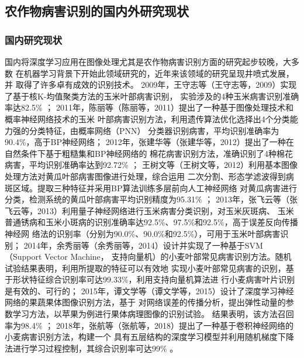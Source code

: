 \subsection{\hei\xiaosan\textbf{农作物病害识别的国内外研究现状}}
  \subsubsection{\hei\sihao\textbf{国内研究现状}}
    国内将深度学习应用在图像处理尤其是农作物病害识别方面的研究起步较晚，大多数
    在机器学习背景下开始此领域研究的，近年来该领域的研究呈现井喷式发展，并
    取得了许多卓有成效的识别技术。
    2009年，王守志等（王守志等，2009）实现了基于核K-均值聚类方法的玉米叶部病害识别，
    实验涉及的4种玉米病害识别准确率达82.5\% \cite{王守志2009基于核}；
    2011年，陈丽等（陈丽等，2011）提出了一种基于图像处理技术和概率神经网络技术的玉米
    叶部病害识别方法，利用遗传算法优化选择出4个分类能力强的分类特征，由概率网络（PNN）
    分类器识别病害，平均识别准确率为90.4\%，高于BP神经网络\cite{陈丽2011概率神经网络在玉米叶部病害识别中的应用}；
    2012年，张建华等（张建华等，2012）提出了一种在自然条件下基于粗糙集和BP神经网络的
    棉花病害识别方法，准确识别了4种棉花病害，平均识别准确率达到92.72\% \cite{张建华2012基于粗糙集和}；
    王树文等（王树文等，2012）利用基本图像处理方法对黄瓜叶部病害图像进行处理，综合运用
    二次分割、形态学滤波得到病斑区域。提取三种特征并采用BP算法训练多层前向人工神经网络
    对黄瓜病害进行分类，检测系统的黄瓜叶部病害平均识别精度为95.31\% \cite{王树文2012基于图像处理技术的黄瓜叶片病害识别诊断系统研究}；
    2013年，张飞云等（张飞云等，2013）利用量子神经网络进行玉米病害分类识别，对玉米灰斑病、
    玉米普通锈病和玉米小斑病的识别准确率达92.5\%、97.5\%和92.5\%，高于误差反向传播神经网
    络法的识别率（分别为90.0\%、90.0\%和92.5\%），可用于玉米叶部病害识别\cite{张飞云2013基于量子神经网络和组合特征参数的玉米叶部病害识别}；
    2014年，余秀丽等（余秀丽等，2014）设计并实现了一种基于SVM（Support Vector Machine，
    支持向量机）的小麦叶部常见病害识别方法。随机试验结果表明，利用所提取的特征可以有效地
    实现小麦叶部常见病害的识别，基于形状特征综合识别率可达99.33\%，利用支持向量机算法进
    行小麦病害叶片识别是有效的、可行的\cite{余秀丽2014基于}；
    2015年，谭文学等（谭文学等，2015）设计了深度学习神经网络的果蔬果体图像识别方法，基于
    对网络误差的传播分析，提出弹性动量的参数学习方法，以苹果为例进行果体病理图像的识别试验。
    结果表明，该方法召回率为98.4\% \cite{谭文学2015基于弹性动量深度学习神经网络的果体病理图像识别}；
    2018年，张航等（张航等，2018）提出了一种基于卷积神经网络的小麦病害识别方法，构建一个
    具有五层结构的深度学习模型并利用随机梯度下降法进行学习过程控制，其综合识别率可达99\% \cite{张航2018一种基于卷积神经网络的小麦病害识别方法}。


